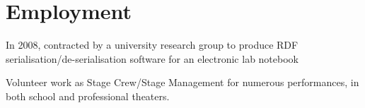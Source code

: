 \documentclass[letterpaper]{article}
\renewenvironment{itemize}{
  \begin{list}{}{
    \setlength{\leftmargin}{1.5em}
  }
}{
  \end{list}
}
\begin{document}
\section*{Employment}
\begin{itemize}
	\item In 2008, contracted by a university research group to produce RDF serialisation/de-serialisation software for an electronic lab notebook
	\item Volunteer work as Stage Crew/Stage Management for numerous performances, in both school and professional theaters.
\end{itemize}
\end{document}
